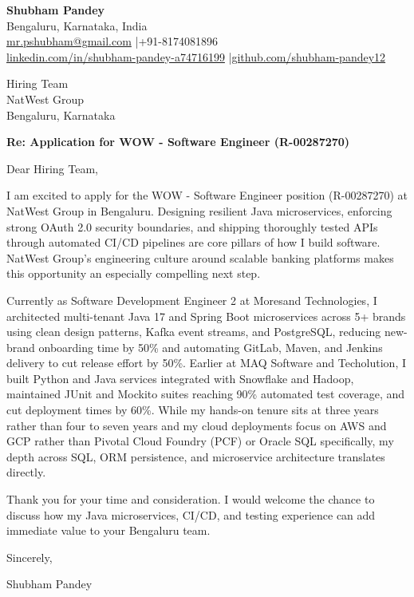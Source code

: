 \documentclass[a4paper,11pt]{article}
\begin{document}
\textbf{Shubham Pandey} \\
Bengaluru, Karnataka, India \\
\href{mailto:mr.pshubham@gmail.com}{mr.pshubham@gmail.com} \quad|\quad +91-8174081896 \\
\href{https://www.linkedin.com/in/shubham-pandey-a74716199/}{linkedin.com/in/shubham-pandey-a74716199} \quad|\quad \href{https://github.com/shubham-pandey12}{github.com/shubham-pandey12}

\vspace{1em}

Hiring Team \\
NatWest Group \\
Bengaluru, Karnataka

\vspace{1em}

\textbf{Re: Application for WOW - Software Engineer (R-00287270)}

Dear Hiring Team,

I am excited to apply for the WOW - Software Engineer position (R-00287270) at NatWest Group in Bengaluru. Designing resilient Java microservices, enforcing strong OAuth 2.0 security boundaries, and shipping thoroughly tested APIs through automated CI/CD pipelines are core pillars of how I build software. NatWest Group's engineering culture around scalable banking platforms makes this opportunity an especially compelling next step.

Currently as Software Development Engineer 2 at Moresand Technologies, I architected multi-tenant Java 17 and Spring Boot microservices across 5+ brands using clean design patterns, Kafka event streams, and PostgreSQL, reducing new-brand onboarding time by 50\% and automating GitLab, Maven, and Jenkins delivery to cut release effort by 50\%. Earlier at MAQ Software and Techolution, I built Python and Java services integrated with Snowflake and Hadoop, maintained JUnit and Mockito suites reaching 90\% automated test coverage, and cut deployment times by 60\%. While my hands-on tenure sits at three years rather than four to seven years and my cloud deployments focus on AWS and GCP rather than Pivotal Cloud Foundry (PCF) or Oracle SQL specifically, my depth across SQL, ORM persistence, and microservice architecture translates directly.

Thank you for your time and consideration. I would welcome the chance to discuss how my Java microservices, CI/CD, and testing experience can add immediate value to your Bengaluru team.

\vspace{1em}

Sincerely,

Shubham Pandey
\end{document}
